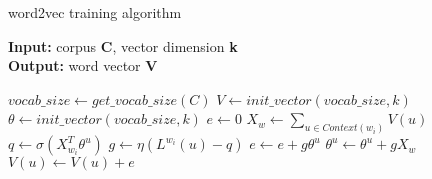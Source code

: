 \documentclass[10pt]{article}
\begin{document}
\begin{algorithm}
  \caption{ word2vec training algorithm}
  \textbf{Input:} corpus \textbf{C}, vector dimension \textbf{k}\\
  \textbf{Output:} word vector \textbf{V}
  \begin{algorithmic}[1]
    \State $vocab\_size \leftarrow get\_vocab\_size(C)$
    \State $V \leftarrow init\_vector(vocab\_size,k)$
    \State $\theta \leftarrow init\_vector(vocab\_size,k)$
    		\State $e \leftarrow 0$
    		\State $X_w \leftarrow \sum_{u \in Context(w_i)} V(u)$
    			\State $q \leftarrow \sigma(X_{w_i}^T\theta^u)$
    			\State $g \leftarrow \eta(L^{w_i}(u)-q)$
    			\State $e \leftarrow e+g\theta^u $
    			\State $\theta^u \leftarrow \theta^u + gX_w$
    		\EndFor
			\State $V(u) \leftarrow V(u) + e$    		
    		\EndFor
    \EndFor
    \EndProcedure
  \end{algorithmic}
\end{algorithm}
\end{document}
